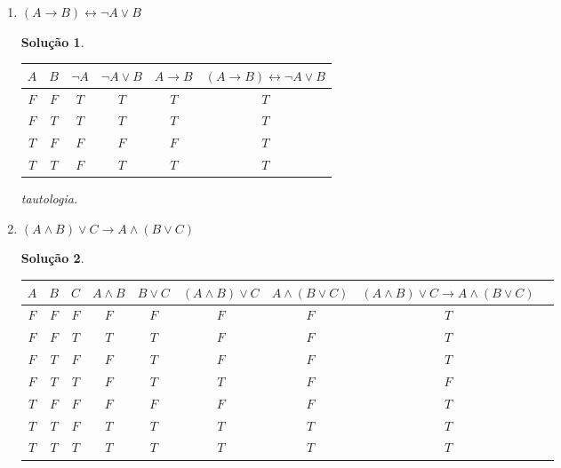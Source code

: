 \documentclass[11pt,a4paper]{report}
\newtheorem*{Solucao}{Solu\c{c}\~ao}
\newcommand{\F}{$F$}
\newcommand{\T}{$T$}
\begin{document}
\begin{enumerate}
\begin{enumerate}
		\item $(A\rightarrow B)\leftrightarrow\neg A\lor B$
                  \begin{Solucao}
                    \verb| |\\
                    \begin{tabular}{|c|c|c|c|c|c|}
                      \hline
                      $A$ & $B$ & $\neg A$ & $\neg A \lor B$ & $A \to B$ & $(A
                      \to B) \leftrightarrow \neg A \lor B$ \\ \hline
                      $F$  & $F$ & $T$ & $T$ & $T$ & $T$ \\
                      $F$  & $T$ & $T$ & $T$ & $T$ & $T$ \\
                      $T$ & $F$  & $F$ & $F$ & $F$ & $T$ \\
                      $T$ & $T$ & $F$ & $T$ & $T$ & $T$\\ \hline
                    \end{tabular}

                    tautologia.
                  \end{Solucao}

		\item $(A\land B)\lor C\rightarrow A\land(B\lor C)$

                  \begin{Solucao}
                    \verb| |\\
                    \begin{tabular}{|c|c|c|c|c|c|c|c|c|}
                      \hline
                      $A$ & $B$ & $C$ &  $A \land B$ & $B\lor C$ & $(A \land B)
                      \lor C$ & $A\land (B \lor C)$ & 
                      $(A \land B) \lor C \to A\land (B\lor C)$ \\ \hline
                      $F$  & $F$ & $F$ & $F$ & $F$ & $F$ & $F$ & $T$ \\
                      $F$  & $F$ & $T$ & $T$ & $T$ & $F$ & $F$ & $T$ \\
                      \F & \T & \F & \F & \T & \F & \F & \T \\ 
                      \F & \T & \T & \F & \T & \T & \F & \F \\
                      \T & \F & \F & \F & \F & \F & \F & \T \\
                      \T & \T & \F & \T & \T & \T & \T & \T \\
                      \T & \T & \T & \T & \T & \T & \T & \T \\ \hline
                    \end{tabular}


\end{Solucao}
\end{enumerate}
\end{enumerate}
\end{document}
